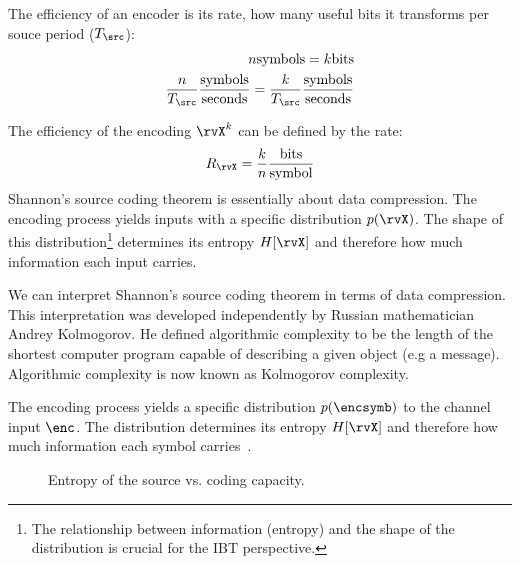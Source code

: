 The efficiency of an encoder is its rate, how many useful bits it transforms per souce period (\(T_{\src}\)):
\begin{align}
	n \text{symbols} = k \text{bits}\\
	\frac{n}{T_{\src}} \frac{\text{symbols}}{\text{seconds}}= \frac{k}{T_{\src}} \frac{\text{symbols}}{\text{seconds}}
\end{align}

The efficiency of the encoding \(\rvX^{k}\) can be defined by the rate:
\begin{align}
	R_{\rvX} = \frac{k}{n} \frac{\text{bits}}{\text{symbol}}
\end{align}
Shannon's source coding theorem is essentially about data compression.
The encoding process yields inputs with a specific distribution \(p(\rvX)\). The shape of this distribution\footnote{The relationship between information (entropy) and the shape of the distribution is crucial for the \ac{IBT} perspective. } determines its entropy \(H[\rvX]\) and therefore how much information each input carries\cite{stone:2015}.

We can interpret Shannon's source coding theorem in terms of data compression.  This interpretation was developed independently by Russian mathematician Andrey Kolmogorov. He defined algorithmic complexity to be the length of the shortest computer program capable of describing a given object (e.g a message).  Algorithmic complexity is now known as Kolmogorov complexity.

The encoding process yields a specific distribution \(p(\encsymb)\) to the channel input $\enc$. The distribution determines its entropy \(H[\rvX]\) and therefore how much information each symbol carries~\cite{stone:2015}.


\begin{figure}[hbt!]
	\centering {}
\caption{Entropy of the source vs. coding capacity.}\label{fig:tube}
\end{figure}

